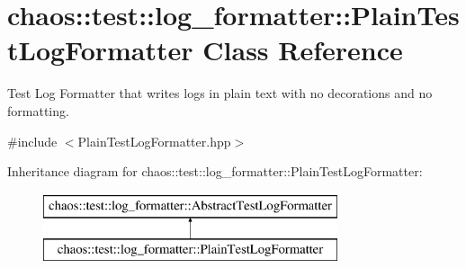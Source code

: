\hypertarget{classchaos_1_1test_1_1log__formatter_1_1_plain_test_log_formatter}{\section{chaos\-:\-:test\-:\-:log\-\_\-formatter\-:\-:Plain\-Test\-Log\-Formatter Class Reference}
\label{classchaos_1_1test_1_1log__formatter_1_1_plain_test_log_formatter}
}


Test Log Formatter that writes logs in plain text with no decorations and no formatting.  




{\ttfamily \#include $<$Plain\-Test\-Log\-Formatter.\-hpp$>$}

Inheritance diagram for chaos\-:\-:test\-:\-:log\-\_\-formatter\-:\-:Plain\-Test\-Log\-Formatter\-:\begin{figure}[H]
\begin{center}
\leavevmode
\includegraphics[height=2.000000cm]{classchaos_1_1test_1_1log__formatter_1_1_plain_test_log_formatter}
\end{center}
\end{figure}
